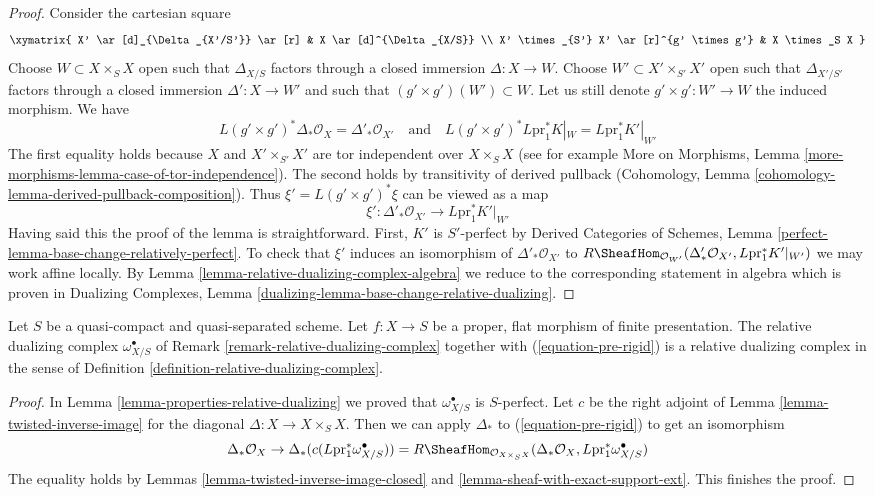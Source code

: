 \begin{proof}
Consider the cartesian square
$$
\xymatrix{
X' \ar[d]_{\Delta_{X'/S'}} \ar[r] & X \ar[d]^{\Delta_{X/S}} \\
X' \times_{S'} X' \ar[r]^{g' \times g'} & X \times_S X
}
$$
Choose $W \subset X \times_S X$ open such that $\Delta_{X/S}$
factors through a closed immersion $\Delta : X \to W$.
Choose $W' \subset X' \times_{S'} X'$ open such that $\Delta_{X'/S'}$
factors through a closed immersion $\Delta' : X \to W'$
and such that $(g' \times g')(W') \subset W$. Let us still denote
$g' \times g' : W' \to W$ the induced morphism. We have
$$
L(g' \times g')^*\Delta_*\mathcal{O}_X =
\Delta'_*\mathcal{O}_{X'}
\quad\text{and}\quad
L(g' \times g')^*L\text{pr}_1^*K|_W =
L\text{pr}_1^*K'|_{W'}
$$
The first equality holds because $X$ and $X' \times_{S'} X'$
are tor independent over $X \times_S X$ (see for example
More on Morphisms, Lemma \ref{more-morphisms-lemma-case-of-tor-independence}).
The second holds by transitivity of derived pullback
(Cohomology, Lemma \ref{cohomology-lemma-derived-pullback-composition}).
Thus $\xi' = L(g' \times g')^*\xi$ can be viewed as a map
$$
\xi' : \Delta'_*\mathcal{O}_{X'} \longrightarrow L\text{pr}_1^*K'|_{W'}
$$
Having said this the proof of the lemma is straightforward.
First, $K'$ is $S'$-perfect by Derived Categories of Schemes, Lemma
\ref{perfect-lemma-base-change-relatively-perfect}.
To check that $\xi'$ induces an isomorphism
of $\Delta'_*\mathcal{O}_{X'}$ to
$R\SheafHom_{\mathcal{O}_{W'}}(
\Delta'_*\mathcal{O}_{X'}, L\text{pr}_1^*K'|_{W'})$
we may work affine locally. By
Lemma \ref{lemma-relative-dualizing-complex-algebra}
we reduce to the corresponding statement in algebra
which is proven in Dualizing Complexes, Lemma
\ref{dualizing-lemma-base-change-relative-dualizing}.
\end{proof}

\begin{lemma}
\label{lemma-flat-proper-relative-dualizing}
Let $S$ be a quasi-compact and quasi-separated scheme.
Let $f : X \to S$ be a proper, flat morphism of finite presentation.
The relative dualizing complex $\omega_{X/S}^\bullet$ of
Remark \ref{remark-relative-dualizing-complex}
together with (\ref{equation-pre-rigid}) is a relative
dualizing complex in the sense of
Definition \ref{definition-relative-dualizing-complex}.
\end{lemma}

\begin{proof}
In Lemma \ref{lemma-properties-relative-dualizing} we proved that
$\omega_{X/S}^\bullet$ is $S$-perfect.
Let $c$ be the right adjoint of
Lemma \ref{lemma-twisted-inverse-image}
for the diagonal $\Delta : X \to X \times_S X$.
Then we can apply $\Delta_*$ to (\ref{equation-pre-rigid})
to get an isomorphism
$$
\Delta_*\mathcal{O}_X \to
\Delta_*(c(L\text{pr}_1^*\omega_{X/S}^\bullet)) =
R\SheafHom_{\mathcal{O}_{X \times_S X}}(
\Delta_*\mathcal{O}_X, L\text{pr}_1^*\omega_{X/S}^\bullet)
$$
The equality holds by
Lemmas \ref{lemma-twisted-inverse-image-closed} and
\ref{lemma-sheaf-with-exact-support-ext}.
This finishes the proof.
\end{proof}

